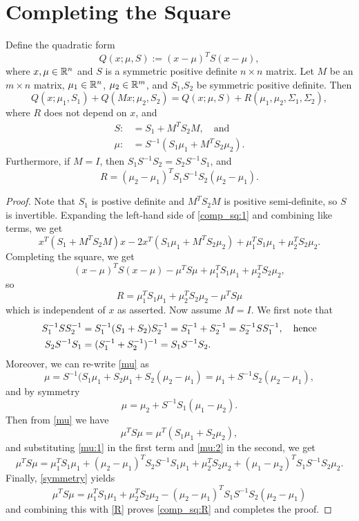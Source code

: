 \documentclass[12pt,leqno]{article}
\begin{document}
\section{Completing the Square} 
\begin{Lem}
 Define the quadratic form
  $$
 Q(x;\mu,S) := (x-\mu)^TS(x-\mu),
  $$
  where $x,\mu\in {\mathbb R}^n$ and  $S$ is a symmetric positive definite $n\times{n}$
  matrix. Let $M$ be an $m\times{n}$ matrix, $\mu_1\in{\mathbb R}^n$, $\mu_2\in{\mathbb R}^m$,
  and $S_1$,$S_2$ be symmetric positive definite.  Then 
\begin{equation}\label{comp_sq:1}
  Q(x;\mu_1,S_1)+Q(Mx;\mu_2,S_2) = Q(x;\mu,S) + R(\mu_1,\mu_2,\Sigma_1,\Sigma_2),
\end{equation}
where $R$ does not depend on $x$, and 
\begin{align}
S :&= S_1 + M^TS_2M, \quad\text{and}\label{sigma}\\
\mu :&= S^{-1}(S_1\mu_1 + M^TS_2\mu_2).\label{mu}
\end{align}
Furthermore, if $M = I$, then $S_1S^{-1}S_2 = S_2S^{-1}S_1$,  and
\begin{equation}\label{comp_sq:R}
R = (\mu_2-\mu_1)^TS_1S^{-1}S_2(\mu_2-\mu_1).
\end{equation}
\end{Lem}
\begin{proof}
  Note that $S_1$ is postive definite and $M^TS_2M$ is positive semi-definite,
so $S$ is invertible.  Expanding the left-hand side of \eqref{comp_sq:1} and combining
like terms, we get
$$
x^T(S_1+ M^TS_2M)x -2x^T(S_1\mu_1+ M^TS_2\mu_2) 
+ \mu_1^TS_1\mu_1 + \mu_2^TS_2\mu_2.
$$
Completing the square, we get
$$
(x-\mu)^TS(x-\mu) -\mu^TS\mu + \mu_1^TS_1\mu_1 + \mu_2^TS_2\mu_2,
$$
so 
\begin{equation}\label{R}
R = \mu_1^TS_1\mu_1 + \mu_2^TS_2\mu_2-\mu^TS\mu 
\end{equation}
which is independent of $x$ as asserted. Now assume $M = I$. We first note that
\begin{align}
S_1^{-1}SS_2^{-1} &= S_1^{-1}(S_1+S_2)S_2^{-1} = S_1^{-1}+S_2^{-1} = S_2^{-1}SS_1^{-1},\quad\text{hence}\notag\\
S_2S^{-1}S_1 &= (S_1^{-1}+S_2^{-1})^{-1} = S_1S^{-1}S_2.\label{symmetry}
\end{align}
Moreover, we can re-write \eqref{mu} as
\begin{equation}\label{mu:1}
\mu = S^{-1}(S_1\mu_1 + S_2\mu_1 + S_2(\mu_2-\mu_1) = \mu_1 + S^{-1}S_2(\mu_2-\mu_1),
\end{equation}
and by symmetry
\begin{equation}\label{mu:2}
\mu = \mu_2 + S^{-1}S_1(\mu_1-\mu_2).
\end{equation}
Then from \eqref{mu} we have
$$
\mu^TS\mu = \mu^T(S_1\mu_1 + S_2\mu_2),
$$
and substituting \eqref{mu:1} in the first term and \eqref{mu:2} in the second, we get
$$
\mu^TS\mu = \mu_1^TS_1\mu_1 + (\mu_2-\mu_1)^TS_2S^{-1}S_1\mu_1 + \mu_2^TS_2\mu_2 + (\mu_1-\mu_2)^TS_1S^{-1}S_2\mu_2.
$$
Finally, \eqref{symmetry} yields
$$
\mu^TS\mu = \mu_1^TS_1\mu_1 + \mu_2^TS_2\mu_2 - (\mu_2-\mu_1)^TS_1S^{-1}S_2(\mu_2-\mu_1)
$$
and combining this with \eqref{R} proves \eqref{comp_sq:R} and completes the proof.
\end{proof}
\end{document}
